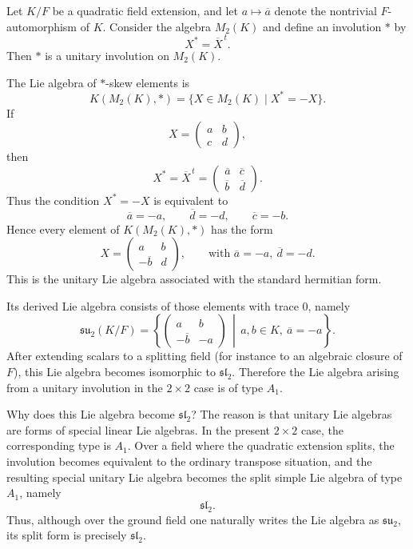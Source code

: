 \documentclass[11pt, a4paper]{report}
\begin{document}
\begin{example}
        Let $K/F$ be a quadratic field extension, and let $a \mapsto \overline{a}$ denote the nontrivial
        $F$-automorphism of $K$. Consider the algebra $M_2(K)$ and define an involution $*$ by
        \[
        X^* = \overline{X}^{\,t}.
        \]
        Then $*$ is a unitary involution on $M_2(K)$.
        
        The Lie algebra of $*$-skew elements is
        \[
        K(M_2(K),*)=\{X\in M_2(K)\mid X^*=-X\}.
        \]
        If
        \[
        X=\begin{pmatrix} a & b \\ c & d \end{pmatrix},
        \]
        then
        \[
        X^*=\overline{X}^{\,t}
        =
        \begin{pmatrix}
        \overline{a} & \overline{c}\\
        \overline{b} & \overline{d}
        \end{pmatrix}.
        \]
        Thus the condition $X^*=-X$ is equivalent to
        \[
        \overline{a}=-a,\qquad \overline{d}=-d,\qquad \overline{c}=-b.
        \]
        Hence every element of $K(M_2(K),*)$ has the form
        \[
        X=
        \begin{pmatrix}
        a & b\\
        -\overline{b} & d
        \end{pmatrix},
        \qquad \text{with } \overline{a}=-a,\ \overline{d}=-d.
        \]
        This is the unitary Lie algebra associated with the standard hermitian form.
        
        Its derived Lie algebra consists of those elements with trace $0$, namely
        \[
        \mathfrak{su}_2(K/F)
        =
        \left\{
        \begin{pmatrix}
        a & b\\
        -\overline{b} & -a
        \end{pmatrix}
        \,\middle|\,
        a,b\in K,\ \overline{a}=-a
        \right\}.
        \]
        After extending scalars to a splitting field (for instance to an algebraic closure of $F$),
        this Lie algebra becomes isomorphic to $\mathfrak{sl}_2$. Therefore the Lie algebra arising
        from a unitary involution in the $2\times 2$ case is of type $A_1$.
\end{example}
        
\begin{remark}
        Why does this Lie algebra become $\mathfrak{sl}_2$? The reason is that unitary Lie algebras are
        forms of special linear Lie algebras. In the present $2\times 2$ case, the corresponding type is
        $A_1$. Over a field where the quadratic extension splits, the involution becomes equivalent to the
        ordinary transpose situation, and the resulting special unitary Lie algebra becomes the split simple
        Lie algebra of type $A_1$, namely
        \[
        \mathfrak{sl}_2.
        \]
        Thus, although over the ground field one naturally writes the Lie algebra as $\mathfrak{su}_2$,
        its split form is precisely $\mathfrak{sl}_2$.
\end{remark}
\end{document}
